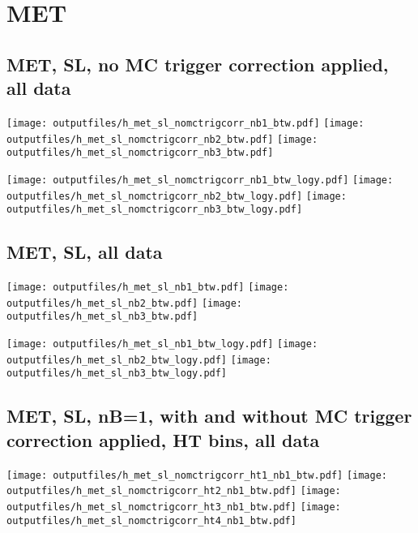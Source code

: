 \documentclass[11pt]{article}
\begin{document}




    \section{MET}
     \subsection{ MET, SL, no MC trigger correction applied, all data}

    \noindent
     \texttt{[image: outputfiles/h\_met\_sl\_nomctrigcorr\_nb1\_btw.pdf]}
     \texttt{[image: outputfiles/h\_met\_sl\_nomctrigcorr\_nb2\_btw.pdf]}
     \texttt{[image: outputfiles/h\_met\_sl\_nomctrigcorr\_nb3\_btw.pdf]}

    \noindent
     \texttt{[image: outputfiles/h\_met\_sl\_nomctrigcorr\_nb1\_btw\_logy.pdf]}
     \texttt{[image: outputfiles/h\_met\_sl\_nomctrigcorr\_nb2\_btw\_logy.pdf]}
     \texttt{[image: outputfiles/h\_met\_sl\_nomctrigcorr\_nb3\_btw\_logy.pdf]}


     \subsection{ MET, SL, all data}

    \noindent
     \texttt{[image: outputfiles/h\_met\_sl\_nb1\_btw.pdf]}
     \texttt{[image: outputfiles/h\_met\_sl\_nb2\_btw.pdf]}
     \texttt{[image: outputfiles/h\_met\_sl\_nb3\_btw.pdf]}

    \noindent
     \texttt{[image: outputfiles/h\_met\_sl\_nb1\_btw\_logy.pdf]}
     \texttt{[image: outputfiles/h\_met\_sl\_nb2\_btw\_logy.pdf]}
     \texttt{[image: outputfiles/h\_met\_sl\_nb3\_btw\_logy.pdf]}


     \subsection{ MET, SL, nB=1, with and without MC trigger correction applied, HT bins, all data}

    \noindent
     \texttt{[image: outputfiles/h\_met\_sl\_nomctrigcorr\_ht1\_nb1\_btw.pdf]}
     \texttt{[image: outputfiles/h\_met\_sl\_nomctrigcorr\_ht2\_nb1\_btw.pdf]}
     \texttt{[image: outputfiles/h\_met\_sl\_nomctrigcorr\_ht3\_nb1\_btw.pdf]}
     \texttt{[image: outputfiles/h\_met\_sl\_nomctrigcorr\_ht4\_nb1\_btw.pdf]}
\end{document}

